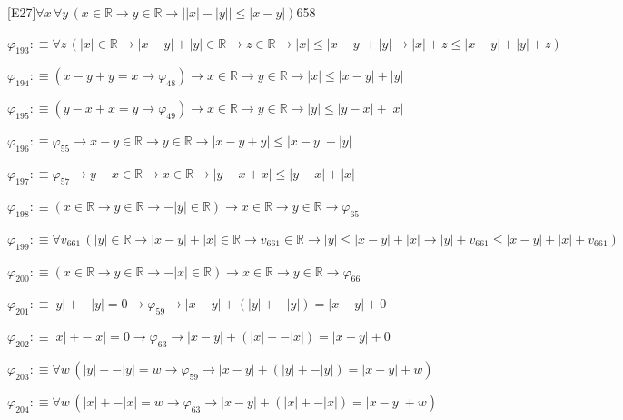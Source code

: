 \begin{fullproof}{[E27]}{$\forall x\,\forall y\,(x \in \mathbb{R} \to y \in \mathbb{R} \to \lvert \lvert x \rvert - \lvert y \rvert \rvert \leq \lvert x - y \rvert)$}{658}
\begin{abbrevlist}
\item $\varphi_{193} :\equiv \forall z\,(\lvert x \rvert \in \mathbb{R} \to \lvert x - y \rvert + \lvert y \rvert \in \mathbb{R} \to z \in \mathbb{R} \to \lvert x \rvert \leq \lvert x - y \rvert + \lvert y \rvert \to \lvert x \rvert + z \leq \lvert x - y \rvert + \lvert y \rvert + z)$
\item $\varphi_{194} :\equiv (x - y + y = x \to \varphi_{48}) \to x \in \mathbb{R} \to y \in \mathbb{R} \to \lvert x \rvert \leq \lvert x - y \rvert + \lvert y \rvert$
\item $\varphi_{195} :\equiv (y - x + x = y \to \varphi_{49}) \to x \in \mathbb{R} \to y \in \mathbb{R} \to \lvert y \rvert \leq \lvert y - x \rvert + \lvert x \rvert$
\item $\varphi_{196} :\equiv \varphi_{55} \to x - y \in \mathbb{R} \to y \in \mathbb{R} \to \lvert x - y + y \rvert \leq \lvert x - y \rvert + \lvert y \rvert$
\item $\varphi_{197} :\equiv \varphi_{57} \to y - x \in \mathbb{R} \to x \in \mathbb{R} \to \lvert y - x + x \rvert \leq \lvert y - x \rvert + \lvert x \rvert$
\item $\varphi_{198} :\equiv (x \in \mathbb{R} \to y \in \mathbb{R} \to -\lvert y \rvert \in \mathbb{R}) \to x \in \mathbb{R} \to y \in \mathbb{R} \to \varphi_{65}$
\item $\varphi_{199} :\equiv \forall v_{661}\,(\lvert y \rvert \in \mathbb{R} \to \lvert x - y \rvert + \lvert x \rvert \in \mathbb{R} \to v_{661} \in \mathbb{R} \to \lvert y \rvert \leq \lvert x - y \rvert + \lvert x \rvert \to \lvert y \rvert + v_{661} \leq \lvert x - y \rvert + \lvert x \rvert + v_{661})$
\item $\varphi_{200} :\equiv (x \in \mathbb{R} \to y \in \mathbb{R} \to -\lvert x \rvert \in \mathbb{R}) \to x \in \mathbb{R} \to y \in \mathbb{R} \to \varphi_{66}$
\item $\varphi_{201} :\equiv \lvert y \rvert + -\lvert y \rvert = 0 \to \varphi_{59} \to \lvert x - y \rvert + (\lvert y \rvert + -\lvert y \rvert) = \lvert x - y \rvert + 0$
\item $\varphi_{202} :\equiv \lvert x \rvert + -\lvert x \rvert = 0 \to \varphi_{63} \to \lvert x - y \rvert + (\lvert x \rvert + -\lvert x \rvert) = \lvert x - y \rvert + 0$
\item $\varphi_{203} :\equiv \forall w\,(\lvert y \rvert + -\lvert y \rvert = w \to \varphi_{59} \to \lvert x - y \rvert + (\lvert y \rvert + -\lvert y \rvert) = \lvert x - y \rvert + w)$
\item $\varphi_{204} :\equiv \forall w\,(\lvert x \rvert + -\lvert x \rvert = w \to \varphi_{63} \to \lvert x - y \rvert + (\lvert x \rvert + -\lvert x \rvert) = \lvert x - y \rvert + w)$

\end{abbrevlist}
\end{fullproof}
